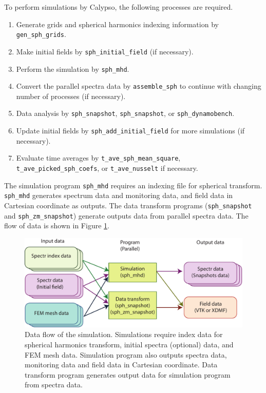%
To perform simulations by Calypso, the following processes are required.
%
\begin{enumerate}
\item Generate grids and spherical harmonics indexing information by \\
\verb|gen_sph_grids|.
\item Make initial fields by \verb|sph_initial_field| (if necessary). 
\item Perform the simulation by \verb|sph_mhd|.
\item Convert the parallel spectra data by \verb|assemble_sph| to continue with changing number of processes (if necessary).
\item Data analysis by \verb|sph_snapshot|, \verb|sph_snapshot|, or \verb|sph_dynamobench|.
\item Update initial fields by \verb|sph_add_initial_field| for more simulations (if necessary).
\item Evaluate time averages by \verb|t_ave_sph_mean_square|, \verb|t_ave_picked_sph_coefs|, or \verb|t_ave_nusselt| if necessary.
\end{enumerate}
%
The simulation program \verb|sph_mhd| requires an indexing file for spherical transform.  \verb|sph_mhd| generates spectrum data and monitoring data, and field data in Cartesian coordinate as outputs. The data transform programs (\verb|sph_snapshot| and \verb|sph_zm_snapshot|) generate outputs data  from parallel spectra data. The flow of data is shown in Figure \ref{fig:flow_0}. 
%
\begin{figure}[H]
\begin{center}
\includegraphics*[width=130mm]{images/flow_0}
\end{center}
\caption{Data flow of the simulation. Simulations require index data for spherical harmonics transform, initial spectra (optional) data, and FEM mesh data. Simulation program also outputs spectra data, monitoring data and  field data in Cartesian coordinate. Data transform program generates output data for simulation program from spectra data.}
\label{fig:flow_0}
\end{figure}
%

